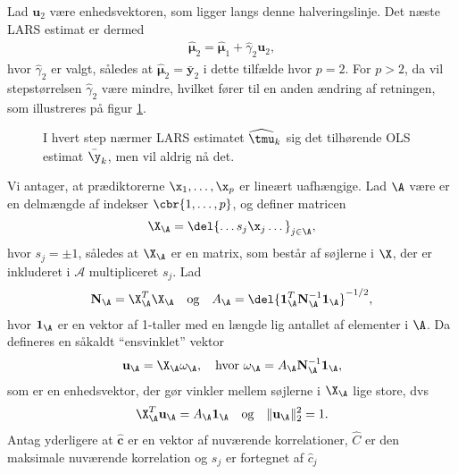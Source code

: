 %
Lad $\mathbf{u}_2$ være enhedsvektoren, som ligger langs denne halveringslinje.
Det næste LARS estimat er dermed
\begin{align*}
\widehat{\boldsymbol{\mu}}_2 = \widehat{\boldsymbol{\mu}}_1+ \widehat{\gamma}_2 \mathbf{u}_2,
\end{align*}
hvor $\widehat{\gamma}_2$ er valgt, således at $\widehat{\boldsymbol{\mu}}_2 = \bar{\textbf{y}}_2$ i dette tilfælde hvor $p = 2$. 
For \(p>2\), da vil stepstørrelsen \(\widehat{\gamma}_2\) være mindre, hvilket fører til en anden ændring af retningen, som illustreres på figur \ref{fig:lars2}.
%
\begin{figure}[H]
\centering
\scalebox{0.8}{}
\caption{I hvert step nærmer LARS estimatet \(\widehat{\tmu}_k\) sig det tilhørende OLS estimat \(\bar{\y}_k\), men vil aldrig nå det.
 }\label{fig:lars2}
\end{figure}
%
Vi antager, at prædiktorerne \(\x_1, \ldots, \x_p\) er lineært uafhængige.
Lad \(\A\) være er en delmængde af indekser \(\cbr{1,\ldots, p}\), og definer matricen
\begin{align}
\X_\A = \del{\dots s_j \x_j \dots}_{j \in \A}, \label{eq:lars_2.4}
\end{align}
hvor $s_j = \pm 1$, således at \(\X_\A\) er en matrix, som består af søjlerne i \(\X\), der er inkluderet i \(\mathcal{A}\) multipliceret \(s_j\).
Lad 
\begin{align}
\mathbf{N}_\A = \X_\A^T \X_\A \quad \text{og} \quad A_\A = \del{\mathbf{1}_\A^T \mathbf{N}_\A^{-1} \mathbf{1}_\A}^{-1/2}, \label{eq:lars_2.5}
\end{align}
hvor \(\mathbf{1}_\A\) er en vektor af 1-taller med en længde lig antallet af elementer i \(\A\).
Da defineres en såkaldt ``ensvinklet'' vektor
\begin{align}
\mathbf{u}_\A = \X_\A \omega_\A, \quad \text{hvor } \omega_\A = A_\A \mathbf{N}_\A^{-1} \mathbf{1}_\A, \label{eq:lars_2.6}
\end{align}
som er en enhedsvektor, der gør vinkler mellem søjlerne i \(\X_\A\) lige store, dvs
\begin{align}
\X_\A^T \mathbf{u}_\A = A_\A \mathbf{1}_\A \quad \text{og} \quad \Vert \mathbf{u}_\A \Vert_2^2 = 1. \label{eq:lars_2.7}
\end{align}
Antag yderligere at \(\widehat{\mathbf{c}}\) er en vektor af nuværende korrelationer, \(\widehat{C}\) er den maksimale nuværende korrelation og \(s_j\) er fortegnet af \(\widehat{c}_j\)
